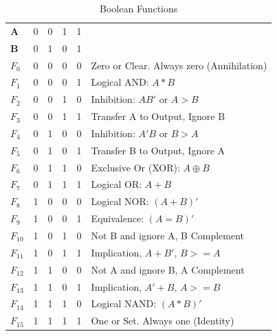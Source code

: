 \begin{table}[ht]
	\caption{Boolean Functions}
	\label{ap:tab:boolean_functions}
	\sffamily
	\newcommand{\head}[1]{\textcolor{white}{\textbf{#1}}}		
	\begin{center}
		\begin{tabular}{llllll}
			\textbf{A} & 0 & 0 & 1 & 1 &  \\ 
			\textbf{B} & 0 & 1 & 0 & 1 &  \\ \hline
			$ F_{0} $ & 0 & 0 & 0 & 0 
			& Zero or Clear. Always zero (Annihilation) \\ 
			$ F_{1} $ & 0 & 0 & 0 & 1 
			& Logical AND: $ A * B $  \\ 
			$ F_{2} $ & 0 & 0 & 1 & 0 
			& Inhibition: $ AB' $ or $ A>B $ \\ 
			$ F_{3} $ & 0 & 0 & 1 & 1 
			& Transfer A to Output, Ignore B \\ 
			$ F_{4} $ & 0 & 1 & 0 & 0 
			& Inhibition: $ A'B $ or $ B>A $ \\ 
			$ F_{5} $ & 0 & 1 & 0 & 1 
			& Transfer B to Output, Ignore A \\ 
			$ F_{6} $ & 0 & 1 & 1 & 0 
			& Exclusive Or (XOR): $ A \oplus B $ \\ 
			$ F_{7} $ & 0 & 1 & 1 & 1 
			& Logical OR: $ A + B $ \\ 
			$ F_{8} $ & 1 & 0 & 0 & 0 
			& Logical NOR: $ (A + B)' $ \\ 
			$ F_{9} $ & 1 & 0 & 0 & 1 
			& Equivalence: $ (A = B)' $ \\ 
			$ F_{10} $ & 1 & 0 & 1 & 0 
			& Not B and ignore A, B Complement \\ 
			$ F_{11} $ & 1 & 0 & 1 & 1 
			& Implication, $ A + B' $, $ B >= A $ \\ 
			$ F_{12} $ & 1 & 1 & 0 & 0 
			& Not A and ignore B, A Complement \\ 
			$ F_{13} $ & 1 & 1 & 0 & 1 
			& Implication, $ A' + B $, $ A >= B $ \\ 
			$ F_{14} $ & 1 & 1 & 1 & 0 
			& Logical NAND: $ (A*B)' $ \\ 
			$ F_{15} $ & 1 & 1 & 1 & 1 
			& One or Set. Always one (Identity) \\ 
		\end{tabular} 
	\end{center}
\end{table}

